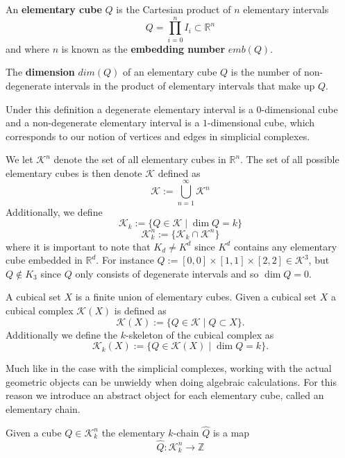 \begin{example}
\begin{definition}
  An \textbf{elementary cube} $Q$ is the Cartesian product of $n$ elementary intervals
  \[Q = \prod^{n}_{i=0} I_{i} \subset \mathbb{R}^{n}\]
  and where $n$ is known as the \textbf{embedding number} $emb(Q)$.
\end{definition}

\begin{definition}
The \textbf{dimension} $dim(Q)$ of an elementary cube $Q$ is the number of non-degenerate intervals in the product of elementary intervals that make up $Q$.
\end{definition}

Under this definition a degenerate elementary interval is a $0$-dimensional cube and a non-degenerate elementary interval is a $1$-dimensional cube, which corresponds to our notion of vertices and edges in simplicial complexes.

We let $\mathcal{K}^{n}$ denote the set of all elementary cubes in $\mathbb{R}^{n}$. The set of all possible elementary cubes is then denote $\mathcal{K}$ defined as
\[ \mathcal{K}:= \bigcup^{\infty}_{n=1} \mathcal{K}^{n} \]
Additionally, we define
\[ \mathcal{K}_{k} := \{ Q \in \mathcal{K} \mid \dim Q = k \}\]
\[ \mathcal{K}^{n}_{k} := \{ \mathcal{K}_{k} \cap \mathcal{K}^{n} \}\]
where it is important to note that $K_{d} \neq K^{d}$ since $K^{d}$ contains any elementary cube embedded in $\mathbb{R}^{d}$. For instance $Q:=[0,0] \times [1,1] \times [2,2] \in \mathcal{K}^{3}$, but $Q \not \in K_{3}$ since $Q$ only consists of degenerate intervals and so $\dim Q = 0$.


\begin{definition}
  A cubical set $X$ is a finite union of elementary cubes. Given a cubical set $X$ a cubical complex $\mathcal{K}(X)$ is defined as
  \[ \mathcal{K}(X):= \{Q \in \mathcal{K} \mid Q \subset X\}.\]
  Additionally we define the $k$-skeleton of the cubical complex as
  \[ \mathcal{K}_{k}(X):= \{ Q \in \mathcal{K}(X) \mid \dim Q = k \}.\]
\end{definition}

Much like in the case with the simplicial complexes, working with the actual geometric objects can be unwieldy when doing algebraic calculations. For this reason we introduce an abstract object for each elementary cube, called an elementary chain.
\begin{definition}
  Given a cube $Q \in \mathcal{K}^{n}_{k}$ the elementary $k$-chain $\hat Q$ is a map
  \[\hat Q: \mathcal{K}^{n}_{k} \to \mathbb{Z}\]
\end{definition}


\end{example}

